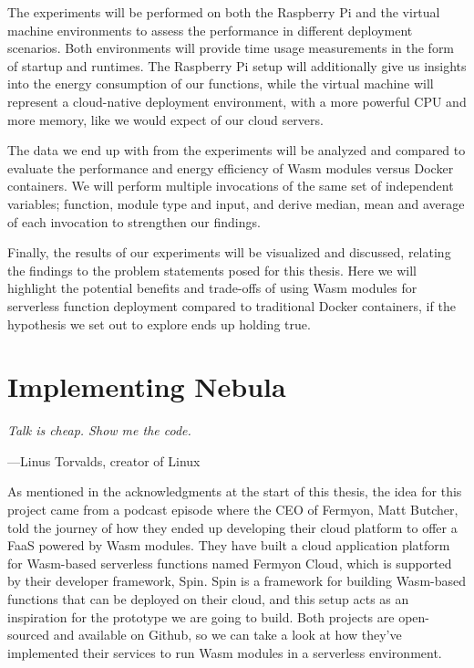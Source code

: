 \documentclass[
  table]{report}
\begin{document}
The experiments will be performed on both the Raspberry Pi and the
virtual machine environments to assess the performance in different
deployment scenarios. Both environments will provide time usage
measurements in the form of startup and runtimes. The Raspberry Pi setup
will additionally give us insights into the energy consumption of our
functions, while the virtual machine will represent a cloud-native
deployment environment, with a more powerful CPU and more memory, like
we would expect of our cloud servers.

The data we end up with from the experiments will be analyzed and
compared to evaluate the performance and energy efficiency of \ac{Wasm}
modules versus Docker containers. We will perform multiple invocations
of the same set of independent variables; function, module type and
input, and derive median, mean and average of each invocation to
strengthen our findings.

Finally, the results of our experiments will be visualized and
discussed, relating the findings to the problem statements posed for
this thesis. Here we will highlight the potential benefits and
trade-offs of using \ac{Wasm} modules for serverless function deployment
compared to traditional Docker containers, if the hypothesis we set out
to explore ends up holding true.

\chapter{Implementing Nebula}
\label{chap:implement}

\epigraph{\itshape  
Talk is cheap. Show me the code.
}{---Linus Torvalds, creator of Linux}

As mentioned in the acknowledgments at the start of this thesis, the
idea for this project came from a podcast episode where the CEO of
Fermyon, Matt Butcher, told the journey of how they ended up developing
their cloud platform to offer a \ac{FaaS} powered by \ac{Wasm} modules.
They have built a cloud application platform for \ac{Wasm}-based
serverless functions named Fermyon Cloud, which is supported by their
developer framework, Spin. Spin is a framework for building
\ac{Wasm}-based functions that can be deployed on their cloud, and this
setup acts as an inspiration for the prototype we are going to build.
Both projects are open-sourced and available on Github, so we can take a
look at how they've implemented their services to run \ac{Wasm} modules
in a serverless environment.
\end{document}

